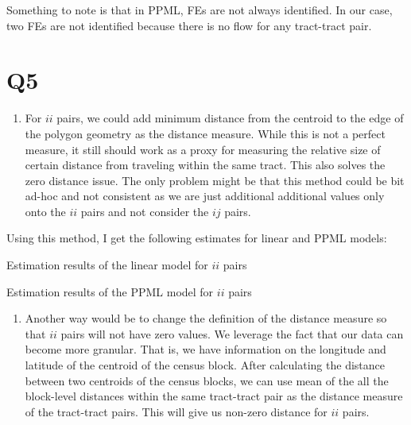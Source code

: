 \documentclass[
  11pt]{article}
\providecommand{\tightlist}{%
  \setlength{\itemsep}{0pt}\setlength{\parskip}{0pt}}
\begin{document}
Something to note is that in PPML, FEs are not always identified. In our
case, two FEs are not identified because there is no flow for any
tract-tract pair.

\section*{Q5}\label{q5}

\begin{enumerate}
\def\labelenumi{\arabic{enumi}.}
\tightlist
\item
  For \(ii\) pairs, we could add minimum distance from the centroid to
  the edge of the polygon geometry as the distance measure. While this
  is not a perfect measure, it still should work as a proxy for
  measuring the relative size of certain distance from traveling within
  the same tract. This also solves the zero distance issue. The only
  problem might be that this method could be bit ad-hoc and not
  consistent as we are just additional additional values only onto the
  \(ii\) pairs and not consider the \(ij\) pairs.
\end{enumerate}

Using this method, I get the following estimates for linear and PPML
models:

\begin{table}[!ht]
\centering
\caption{Estimation results of the linear model for $ii$ pairs}
\label{tab:est_linear_ii}

\end{table}

\begin{table}[!ht]
\centering
\caption{Estimation results of the PPML model for $ii$ pairs}
\label{tab:est_ppml_ii}

\end{table}

\begin{enumerate}
\def\labelenumi{\arabic{enumi}.}
\setcounter{enumi}{1}
\tightlist
\item
  Another way would be to change the definition of the distance measure
  so that \(ii\) pairs will not have zero values. We leverage the fact
  that our data can become more granular. That is, we have information
  on the longitude and latitude of the centroid of the census block.
  After calculating the distance between two centroids of the census
  blocks, we can use mean of the all the block-level distances within
  the same tract-tract pair as the distance measure of the tract-tract
  pairs. This will give us non-zero distance for \(ii\) pairs.
\end{enumerate}
\end{document}
